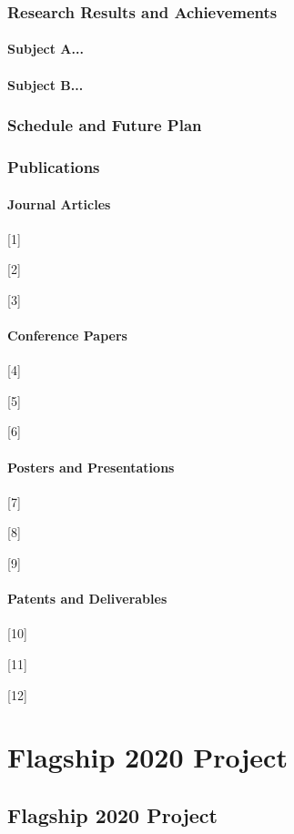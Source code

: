 \documentclass{book}
\begin{document}
\section{Research Results and Achievements}

\subsection{Subject A...}

\subsection{Subject B...}

\section{Schedule and Future Plan}

\section{Publications}

\subsection{Journal Articles}

[1] 

[2]

[3]

\subsection{Conference Papers}

[4]

[5]

[6]

\subsection{Posters and Presentations}

[7]

[8]

[9]

\subsection{Patents and Deliverables}

[10]

[11]

[12]


\part{Flagship 2020 Project}


\chapter{Flagship 2020 Project}
\end{document}
